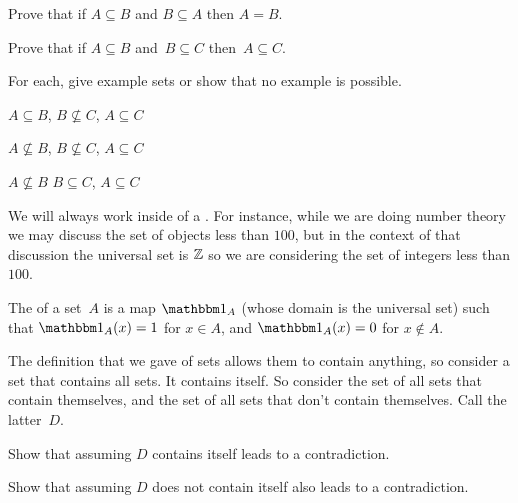 \documentclass{ibl}
\begin{document}
\begin{ex}
\begin{exes} 
\item {}
  Prove that if $A\subseteq B$ and $B\subseteq A$ then $A=B$.  
\item {}
  Prove that if $A\subseteq B$ and~$B\subseteq C$ then~$A\subseteq C$.  
\end{exes}
\end{ex}

\begin{ex} For each, give example sets or show that no example is possible.
\begin{exes}
\item $A\subseteq B$, $B\not\subseteq C$, $A\subseteq C$
\item $A\not\subseteq B$, $B\not\subseteq C$, $A\subseteq C$
\item $A\not\subseteq B$ $B\subseteq C$, $A\subseteq C$    
\end{exes}
\end{ex}

We will always work inside of a .
For instance, while we are doing number theory we may discuss 
the set of objects less than $100$,
but in the context of that discussion the universal set is $\mathbb{Z}$ 
so we are considering the set of integers less than $100$.

\begin{df}
The  of a set~$A$ is a map
$\charfcn{A}$ (whose domain is the universal set) such that
$\charfcn{A}(x)=1$ for $x\in A$, and $\charfcn{A}(x)=0$ for $x\notin A$.  
\end{df}

\begin{ex} 
The definition that we gave of sets allows them to contain anything, so 
consider a set that contains all sets.
It contains itself.
So consider the set of all sets that contain themselves, and  
the set of all sets that don't contain themselves.
Call the latter~$D$.
\begin{exes}
\item Show that assuming $D$ contains itself leads to a contradiction.
\item Show that assuming $D$ does not contain itself also leads to a
contradiction.  
\end{exes}
\end{ex}
\end{document}
